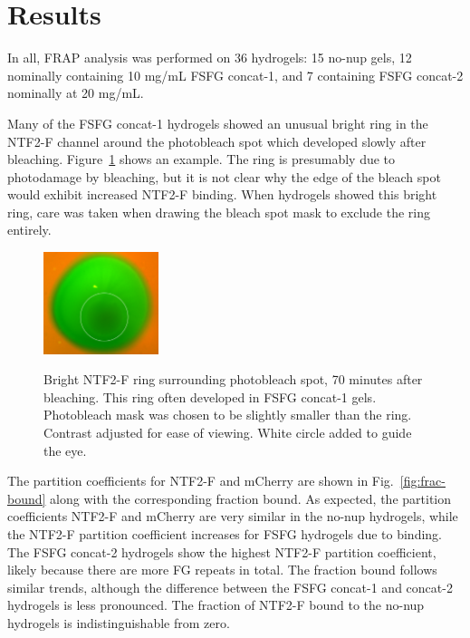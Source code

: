 \section{Results}

In all, FRAP analysis was performed on 36 hydrogels: 15 no-nup gels, 12 nominally containing 10 mg/mL FSFG concat-1, and 7 containing FSFG concat-2 nominally at 20 mg/mL. %

Many of the FSFG concat-1 hydrogels showed an unusual bright ring in the NTF2-F channel around the photobleach spot which developed slowly after bleaching.  Figure~\ref{fig:ring} shows an example.  The ring is presumably due to photodamage by bleaching, but it is not clear why the edge of the bleach spot would exhibit increased NTF2-F binding.  When hydrogels showed this bright ring, care was taken when drawing the bleach spot mask to exclude the ring entirely.

\begin{figure}
\caption[Bright NTF2-F ring surrounding photobleach spot.]{Bright NTF2-F ring surrounding photobleach spot, 70 minutes after bleaching.  This ring often developed in FSFG concat-1 gels.  Photobleach mask was chosen to be slightly smaller than the ring.  Contrast adjusted for ease of viewing. White circle added to guide the eye.\\}
\centering
\includegraphics[width=0.3\textwidth]{figs/ch04/ring}
\label{fig:ring}
\end{figure} 

The partition coefficients for NTF2-F and mCherry are shown in Fig.~\ref{fig:frac-bound} along with the corresponding fraction bound.  As expected, the partition coefficients NTF2-F and mCherry are very similar in the no-nup hydrogels, while the NTF2-F partition coefficient increases for FSFG hydrogels due to binding.  The FSFG concat-2 hydrogels show the highest NTF2-F partition coefficient, likely because there are more FG repeats in total.  The fraction bound follows similar trends, although the difference between the FSFG concat-1 and concat-2 hydrogels is less pronounced.  The fraction of NTF2-F bound to the no-nup hydrogels is indistinguishable from zero.

